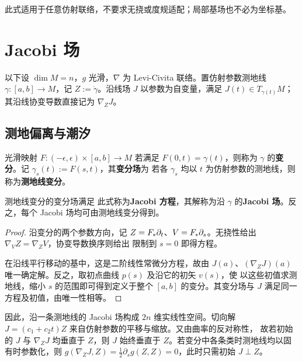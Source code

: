 \begin{remark}
    此式适用于任意仿射联络，不要求无挠或度规适配；局部基场也不必为坐标基。
\end{remark}

\section{Jacobi 场}

以下设 $\dim M=n$，$g$ 光滑，$\nabla$ 为 Levi-Civita 联络。置仿射参数测地线 $\gamma:[a,b]\to M$，记 $Z:=\dot\gamma$。沿线场 $J$ 以参数为自变量，满足 $J(t)\in T_{\gamma(t)}M$；其沿线协变导数直接记为 $\nabla_ZJ$。

\subsection{测地偏离与潮汐}

\begin{definition}
    光滑映射 $F:(-\epsilon,\epsilon)\times[a,b]\to M$ 若满足 $F(0,t)=\gamma(t)$，则称为 $\gamma$ 的\textbf{变分}。记 $\gamma_s(t):=F(s,t)$，其\textbf{变分场}为
    若各 $\gamma_s$ 均以 $t$ 为仿射参数的测地线，则称为\textbf{测地线变分}。
\end{definition}

\begin{theorem}[测地偏离方程]
    测地线变分的变分场满足
    此式称为\textbf{Jacobi 方程}，其解称为沿 $\gamma$ 的\textbf{Jacobi 场}。反之，每个 Jacobi 场均可由测地线变分得到。
\end{theorem}
\begin{proof}
    沿变分的两个参数方向，记 $Z=F_*\partial_t$、$V=F_*\partial_s$。无挠性给出 $\nabla_VZ=\nabla_ZV$，协变导数换序则给出
    限制到 $s=0$ 即得方程。

    在沿线平行移动的基中，这是二阶线性常微分方程，故由 $J(a)$、$(\nabla_ZJ)(a)$ 唯一确定解。反之，取初点曲线 $p(s)$ 及沿它的初矢 $v(s)$，使
    以这些初值求测地线，缩小 $s$ 的范围即可得到定义于整个 $[a,b]$ 的变分。其变分场与 $J$ 满足同一方程及初值，由唯一性相等。
\end{proof}

因此，沿一条测地线的 Jacobi 场构成 $2n$ 维实线性空间。切向解 $J=(c_1+c_2t)Z$ 来自仿射参数的平移与缩放。又由曲率的反对称性，
故若初始的 $J$ 与 $\nabla_ZJ$ 均垂直于 $Z$，则 $J$ 始终垂直于 $Z$。若变分中各条类时测地线均以固有时参数化，则 $g(\nabla_ZJ,Z)=\frac12\partial_s g(Z,Z)=0$，此时只需初始 $J\perp Z$。


